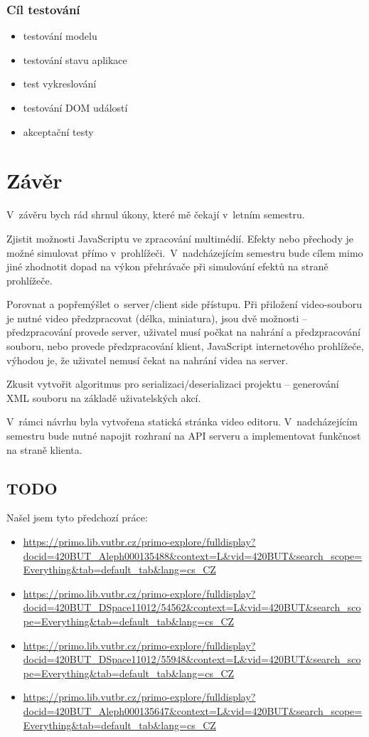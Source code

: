 \subsection{Cíl testování}
\begin{itemize}
\item testování modelu
\item testování stavu aplikace
\item test vykreslování
\item testování DOM událostí
\item akceptační testy
\end{itemize}
\cite{Mastering_TypeScript}

\chapter{Závěr}
V~závěru bych rád shrnul úkony, které mě čekají v~letním semestru.

Zjistit možnosti JavaScriptu ve zpracování multimédií. Efekty nebo přechody je možné simulovat přímo v~prohlížeči.\,\cite{ManipulatingVideo} V~nadcházejícím semestru bude cílem mimo jiné zhodnotit dopad na výkon přehrávače při simulování efektů na straně prohlížeče.

Porovnat a popřemýšlet o~server/client side přístupu. Při přiložení video-souboru je nutné video předzpracovat (délka, miniatura), jsou dvě možnosti -- předzpracování provede server, uživatel musí počkat na nahrání a předzpracování souboru, nebo provede předzpracování klient, JavaScript internetového prohlížeče, výhodou je, že uživatel nemusí čekat na nahrání videa na server.

Zkusit vytvořit algoritmus pro serializaci/deserializaci projektu -- generování XML souboru na základě uživatelských akcí.

V~rámci návrhu byla vytvořena statická stránka video editoru. V~nadcházejícím semestru bude nutné napojit rozhraní na API serveru a implementovat funkčnost na straně klienta.

\section{TODO}
Našel jsem tyto předchozí práce:\\
\begin{itemize}
\item \url{https://primo.lib.vutbr.cz/primo-explore/fulldisplay?docid=420BUT_Aleph000135488&context=L&vid=420BUT&search_scope=Everything&tab=default_tab&lang=cs_CZ}
\item \url{https://primo.lib.vutbr.cz/primo-explore/fulldisplay?docid=420BUT_DSpace11012/54562&context=L&vid=420BUT&search_scope=Everything&tab=default_tab&lang=cs_CZ}
\item \url{https://primo.lib.vutbr.cz/primo-explore/fulldisplay?docid=420BUT_DSpace11012/55948&context=L&vid=420BUT&search_scope=Everything&tab=default_tab&lang=cs_CZ}
\item \url{https://primo.lib.vutbr.cz/primo-explore/fulldisplay?docid=420BUT_Aleph000135647&context=L&vid=420BUT&search_scope=Everything&tab=default_tab&lang=cs_CZ}
\end{itemize}

